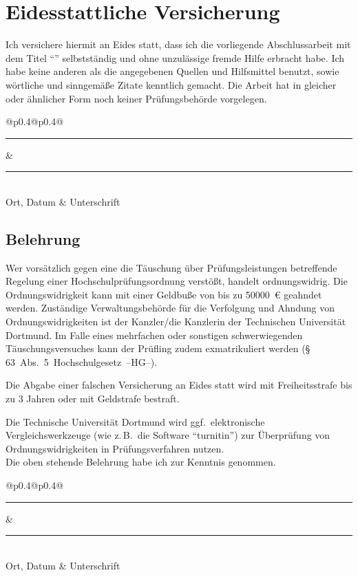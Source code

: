 \thispagestyle{empty}
\section*{Eidesstattliche Versicherung}
Ich versichere hiermit an Eides statt, dass ich die vorliegende Abschlussarbeit mit dem Titel \enquote{\thetitle} selbstständig und ohne unzulässige fremde Hilfe erbracht habe.
Ich habe keine anderen als die angegebenen Quellen und Hilfsmittel benutzt, sowie wörtliche und sinngemäße Zitate kenntlich gemacht. 
Die Arbeit hat in gleicher oder ähnlicher Form noch keiner Prüfungsbehörde vorgelegen.

\vspace*{1cm}\noindent
\begin{center}
  \begin{tabular}{@{}p{0.4\textwidth}@{\hspace{0.15\textwidth}}p{0.4\textwidth}@{}}
  \rule{\linewidth}{0.25pt}& \rule{\linewidth}{0.25pt}\\
  Ort, Datum & Unterschrift
  \end{tabular}
\end{center}

\subsection*{Belehrung}
Wer vorsätzlich gegen eine die Täuschung über Prüfungsleistungen betreffende Regelung einer Hochschulprüfungsordnung verstößt, handelt ordnungswidrig.
Die Ordnungswidrigkeit kann mit einer Geldbuße von bis zu \SI[round-mode=places, round-precision=2]{50000}{€} geahndet werden. 
Zuständige Verwaltungsbehörde für die Verfolgung und Ahndung von Ordnungswidrigkeiten ist der Kanzler/die Kanzlerin der Technischen Universität Dortmund. 
Im Falle eines mehrfachen oder sonstigen schwerwiegenden Täuschungsversuches kann der Prüfling zudem exmatrikuliert werden \mbox{(\S\,63 Abs. 5 Hochschulgesetz --HG--).}

Die Abgabe einer falschen Versicherung an Eides statt wird mit Freiheitsstrafe bis zu 3 Jahren oder mit Geldstrafe bestraft.

Die Technische Universität Dortmund wird ggf.\ elektronische Vergleichswerkzeuge (wie z.\,B.\ die Software \enquote{turnitin}) zur Überprüfung von Ordnungswidrigkeiten in Prüfungsverfahren nutzen. \\[\baselineskip]

\noindent Die oben stehende Belehrung habe ich zur Kenntnis genommen.\\[1cm]
\begin{center}
\begin{tabular}{@{}p{0.4\textwidth}@{\hspace{0.15\textwidth}}p{0.4\textwidth}@{}}
\rule{\linewidth}{0.25pt}& \rule{\linewidth}{0.25pt}\\
Ort, Datum & Unterschrift
\end{tabular}
\end{center}
